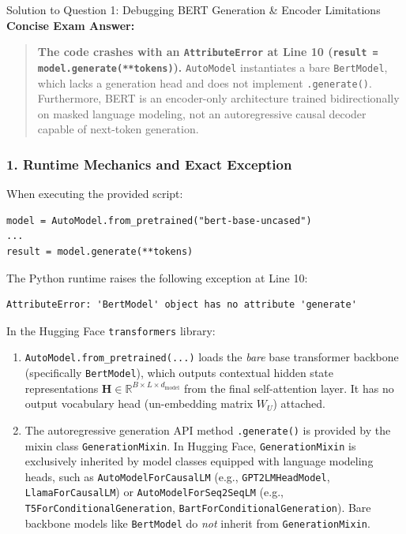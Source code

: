 \documentclass[11pt,a4paper]{article}
\begin{document}
\begin{solutionbox}{Solution to Question 1: Debugging BERT Generation \& Encoder Limitations}
\textbf{Concise Exam Answer:}
\begin{quote}
\textbf{The code crashes with an \texttt{AttributeError} at Line 10 (\texttt{result = model.generate(**tokens)}).} \texttt{AutoModel} instantiates a bare \texttt{BertModel}, which lacks a generation head and does not implement \texttt{.generate()}. Furthermore, BERT is an encoder-only architecture trained bidirectionally on masked language modeling, not an autoregressive causal decoder capable of next-token generation.
\end{quote}

\subsubsection*{1. Runtime Mechanics and Exact Exception}
When executing the provided script:
\begin{lstlisting}[style=pythonstyle,numbers=none]
model = AutoModel.from_pretrained("bert-base-uncased")
...
result = model.generate(**tokens)
\end{lstlisting}
The Python runtime raises the following exception at Line 10:
\begin{lstlisting}[style=diffstyle]
AttributeError: 'BertModel' object has no attribute 'generate'
\end{lstlisting}
In the Hugging Face \texttt{transformers} library:
\begin{enumerate}
    \item \texttt{AutoModel.from\_pretrained(...)} loads the \emph{bare} base transformer backbone (specifically \texttt{BertModel}), which outputs contextual hidden state representations $\mathbf{H} \in \mathbb{R}^{B \times L \times d_{\text{model}}}$ from the final self-attention layer. It has no output vocabulary head (un-embedding matrix $W_U$) attached.
    \item The autoregressive generation API method \texttt{.generate()} is provided by the mixin class \texttt{GenerationMixin}. In Hugging Face, \texttt{GenerationMixin} is exclusively inherited by model classes equipped with language modeling heads, such as \texttt{AutoModelForCausalLM} (e.g., \texttt{GPT2LMHeadModel}, \texttt{LlamaForCausalLM}) or \texttt{AutoModelForSeq2SeqLM} (e.g., \texttt{T5ForConditionalGeneration}, \texttt{BartForConditionalGeneration}). Bare backbone models like \texttt{BertModel} do \emph{not} inherit from \texttt{GenerationMixin}.
\end{enumerate}


\end{solutionbox}
\end{document}
